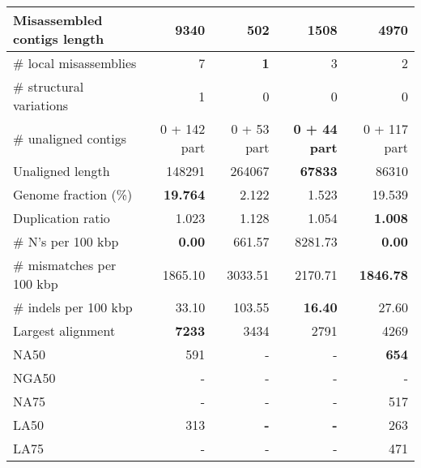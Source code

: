 \documentclass[12pt,a4paper]{article}
\begin{document}
\begin{table}[ht]
\begin{center}
\begin{tabular}{|l*{4}{|r}|}
Misassembled contigs length & 9340 & {\bf 502} & 1508 & 4970 \\ \hline
\# local misassemblies & 7 & {\bf 1} & 3 & 2 \\ \hline
\# structural variations & 1 & 0 & 0 & 0 \\ \hline
\# unaligned contigs & 0 + 142 part & 0 + 53 part & {\bf 0 + 44 part} & 0 + 117 part \\ \hline
Unaligned length & 148291 & 264067 & {\bf 67833} & 86310 \\ \hline
Genome fraction (\%) & {\bf 19.764} & 2.122 & 1.523 & 19.539 \\ \hline
Duplication ratio & 1.023 & 1.128 & 1.054 & {\bf 1.008} \\ \hline
\# N's per 100 kbp & {\bf 0.00} & 661.57 & 8281.73 & {\bf 0.00} \\ \hline
\# mismatches per 100 kbp & 1865.10 & 3033.51 & 2170.71 & {\bf 1846.78} \\ \hline
\# indels per 100 kbp & 33.10 & 103.55 & {\bf 16.40} & 27.60 \\ \hline
Largest alignment & {\bf 7233} & 3434 & 2791 & 4269 \\ \hline
NA50 & 591 & - & - & {\bf 654} \\ \hline
NGA50 & - & - & - & - \\ \hline
NA75 & - & - & - & 517 \\ \hline
LA50 & 313 & {\bf -} & {\bf -} & 263 \\ \hline
LA75 & - & - & - & 471 \\ \hline
\end{tabular}
\end{center}
\end{table}
\end{document}
